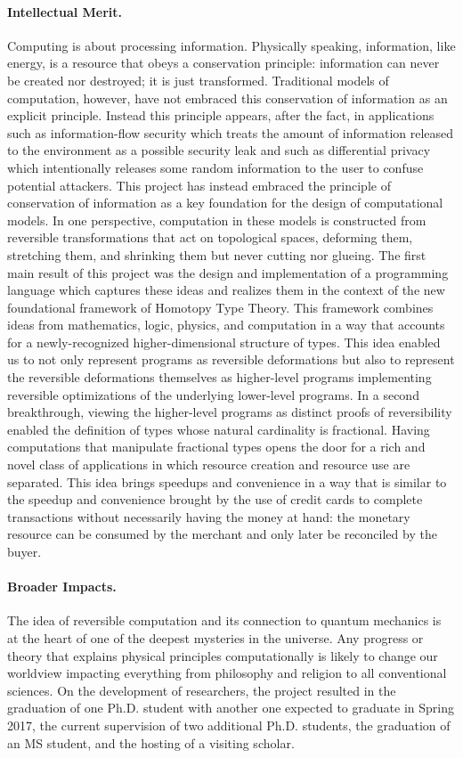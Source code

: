 \documentclass{article}
\theoremstyle{remark}
\begin{document}
\paragraph*{Intellectual Merit.} Computing is about processing
information. Physically speaking, information, like energy, is a
resource that obeys a conservation principle: information can never be
created nor destroyed; it is just transformed. Traditional models of
computation, however, have not embraced this conservation of
information as an explicit principle. Instead this principle appears,
after the fact, in applications such as information-flow security
which treats the amount of information released to the environment as
a possible security leak and such as differential privacy which
intentionally releases some random information to the user to confuse
potential attackers. This project has instead embraced the principle
of conservation of information as a key foundation for the design of
computational models. In one perspective, computation in these models
is constructed from reversible transformations that act on topological
spaces, deforming them, stretching them, and shrinking them but never
cutting nor glueing. The first main result of this project was the
design and implementation of a programming language which captures
these ideas and realizes them in the context of the new foundational
framework of Homotopy Type Theory. This framework combines ideas from
mathematics, logic, physics, and computation in a way that accounts
for a newly-recognized higher-dimensional structure of types. This
idea enabled us to not only represent programs as reversible
deformations but also to represent the reversible deformations
themselves as higher-level programs implementing reversible
optimizations of the underlying lower-level programs. In a second
breakthrough, viewing the higher-level programs as distinct proofs of
reversibility enabled the definition of types whose natural
cardinality is fractional. Having computations that manipulate
fractional types opens the door for a rich and novel class of
applications in which resource creation and resource use are
separated. This idea brings speedups and convenience in a way that is
similar to the speedup and convenience brought by the use of credit
cards to complete transactions without necessarily having the money at
hand: the monetary resource can be consumed by the merchant and only
later be reconciled by the buyer.

\paragraph*{Broader Impacts.} The idea of reversible computation and
its connection to quantum mechanics is at the heart of one of the
deepest mysteries in the universe. Any progress or theory that
explains physical principles computationally is likely to change our
worldview impacting everything from philosophy and religion to all
conventional sciences. On the development of researchers, the project
resulted in the graduation of one Ph.D. student with another one
expected to graduate in Spring 2017, the current supervision of two
additional Ph.D. students, the graduation of an MS student, and the
hosting of a visiting scholar.
\end{document}

